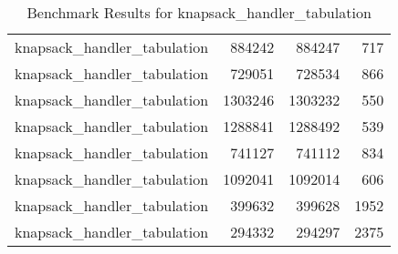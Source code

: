 \documentclass[runningheads]{llncs}
\begin{document}
\begin{table}[h]
\begin{tabular}{@{}lrrr@{}}
        knapsack\_handler\_tabulation & 884242 & 884247 & 717 \\
        knapsack\_handler\_tabulation & 729051 & 728534 & 866 \\
        knapsack\_handler\_tabulation & 1303246 & 1303232 & 550 \\
        knapsack\_handler\_tabulation & 1288841 & 1288492 & 539 \\
        knapsack\_handler\_tabulation & 741127 & 741112 & 834 \\
        knapsack\_handler\_tabulation & 1092041 & 1092014 & 606 \\
        knapsack\_handler\_tabulation & 399632 & 399628 & 1952 \\
        knapsack\_handler\_tabulation & 294332 & 294297 & 2375 \\
        \bottomrule
    \end{tabular}
    \caption{Benchmark Results for knapsack\_handler\_tabulation}
\end{table}
\clearpage
\end{document}
